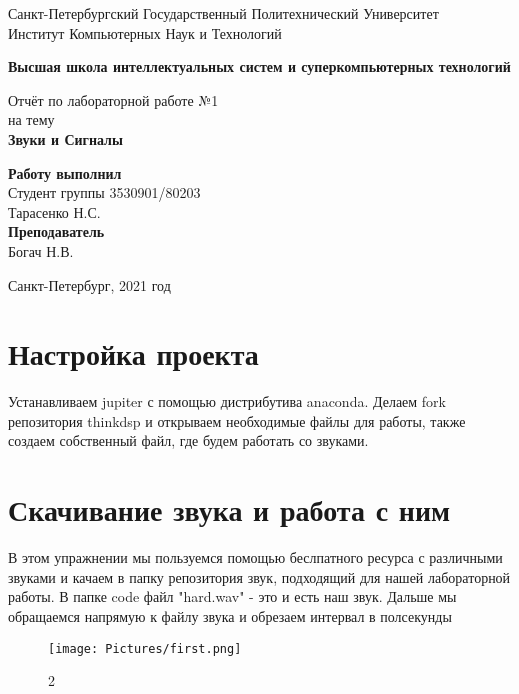 \documentclass[10pt,a4paper,oneside]{article}
\begin{document}
\begin{titlepage}
\newpage
	\begin{center}
		\Large Санкт-Петербургский Государственный Политехнический Университет\\
		Институт Компьютерных Наук и Технологий\\
	\end{center}
	\begin{center}
		\large\textbf {Высшая школа интеллектуальных систем и суперкомпьютерных технологий}
	\end{center}
	
	\vspace{5em}
	\begin{center}
		\large{Отчёт по лабораторной работе №1 \\ на тему \\
		\textbf{Звуки и Сигналы} }
	\end{center}
	
	\vspace{25em}
	\begin{flushright}
		\textbf{Работу выполнил\\}Студент группы 3530901/80203 \\ Тарасенко Н.С.\\
		\textbf{Преподаватель\\}Богач Н.В. 
	\end{flushright}
	
	\vspace{\fill}%
	\begin{center}
	Санкт-Петербург, 2021 год	
	\end{center}
\end{titlepage} %

\section{Настройка проекта}
Устанавливаем jupiter с помощью дистрибутива anaconda. Делаем fork репозитория thinkdsp и открываем необходимые файлы для работы, также создаем собственный файл, где будем работать со звуками.

\section{Скачивание звука и работа с ним}
В этом упражнении мы пользуемся помощью беслпатного ресурса с различными звуками и качаем в папку репозитория звук, подходящий для нашей лабораторной работы. В папке code файл "hard.wav" - это и есть наш звук.  Дальше мы обращаемся напрямую к файлу звука и обрезаем интервал в полсекунды
\begin{figure}[H]
        \centering
        \texttt{[image: Pictures/first.png]}
        \caption{2}
        \label{fig:first}
\end{figure}
\end{document}
